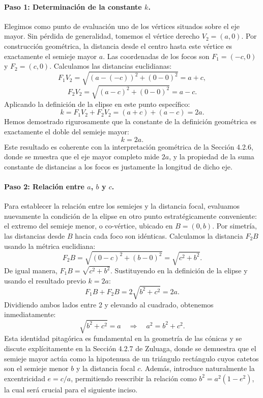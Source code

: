 \documentclass[12pt, a4paper]{article}
\begin{document}
\paragraph{Paso 1: Determinación de la constante $k$.}
Elegimos como punto de evaluación uno de los vértices situados sobre el eje mayor. Sin pérdida de generalidad, tomemos el vértice derecho $V_2 = (a, 0)$. Por construcción geométrica, la distancia desde el centro hasta este vértice es exactamente el semieje mayor $a$. Las coordenadas de los focos son $F_1 = (-c, 0)$ y $F_2 = (c, 0)$. Calculamos las distancias euclidianas:
$$
F_1V_2 = \sqrt{(a - (-c))^2 + (0 - 0)^2} = a + c,
$$
$$
F_2V_2 = \sqrt{(a - c)^2 + (0 - 0)^2} = a - c.
$$
Aplicando la definición de la elipse en este punto específico:
$$
k = F_1V_2 + F_2V_2 = (a + c) + (a - c) = 2a.
$$
Hemos demostrado rigurosamente que la constante de la definición geométrica es exactamente el doble del semieje mayor:
$$
\boxed{k = 2a}.
$$
Este resultado es coherente con la interpretación geométrica de la Sección 4.2.6, donde se muestra que el eje mayor completo mide $2a$, y la propiedad de la suma constante de distancias a los focos es justamente la longitud de dicho eje.

\paragraph{Paso 2: Relación entre $a$, $b$ y $c$.}
Para establecer la relación entre los semiejes y la distancia focal, evaluamos nuevamente la condición de la elipse en otro punto estratégicamente conveniente: el extremo del semieje menor, o co-vértice, ubicado en $B = (0, b)$. Por simetría, las distancias desde $B$ hacia cada foco son idénticas. Calculamos la distancia $F_2B$ usando la métrica euclidiana:
$$
F_2B = \sqrt{(0 - c)^2 + (b - 0)^2} = \sqrt{c^2 + b^2}.
$$
De igual manera, $F_1B = \sqrt{c^2 + b^2}$. Sustituyendo en la definición de la elipse y usando el resultado previo $k = 2a$:
$$
F_1B + F_2B = 2\sqrt{b^2 + c^2} = 2a.
$$
Dividiendo ambos lados entre 2 y elevando al cuadrado, obtenemos inmediatamente:
$$
\sqrt{b^2 + c^2} = a \quad \Longrightarrow \quad a^2 = b^2 + c^2.
$$
Esta identidad pitagórica es fundamental en la geometría de las cónicas y se discute explícitamente en la Sección 4.2.7 de Zuluaga, donde se demuestra que el semieje mayor actúa como la hipotenusa de un triángulo rectángulo cuyos catetos son el semieje menor $b$ y la distancia focal $c$. Además, introduce naturalmente la excentricidad $e = c/a$, permitiendo reescribir la relación como $b^2 = a^2(1 - e^2)$, la cual será crucial para el siguiente inciso.
\end{document}
